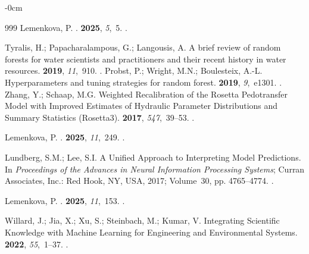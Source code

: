 \documentclass[land,review,accept,pdftex,oneauthor]{Definitions/mdpi}
\begin{document}
\begin{adjustwidth}{-\extralength}{0cm}
\begin{thebibliography}{999}
Lemenkova, P.
.
 {\bf 2025}, {\em 5},~5.
.

Tyralis, H.; Papacharalampous, G.; Langousis, A.
\newblock A brief review of random forests for water scientists and practitioners and their recent history in water resources.
 {\bf 2019}, {\em 11},~910.
.
Probst, P.; Wright, M.N.; Boulesteix, A.-L.
\newblock Hyperparameters and tuning strategies for random forest.
 {\bf 2019}, {\em 9},~e1301.
.
Zhang, Y.; Schaap, M.G.
\newblock Weighted Recalibration of the Rosetta Pedotransfer Model with
  Improved Estimates of Hydraulic Parameter Distributions and Summary
  Statistics ({Rosetta3}).
 {\bf 2017}, {\em 547},~39--53.
.

Lemenkova, P.
.
 {\bf 2025}, {\em 11},~249.
.

Lundberg, S.M.; Lee, S.I.
\newblock A Unified Approach to Interpreting Model Predictions.
\newblock In \emph{Proceedings of the Advances in Neural Information Processing
  Systems};  Curran Associates, Inc.: Red Hook, NY, USA,  2017; Volume~30, pp. 4765--4774.
.

Lemenkova, P.
.
 {\bf 2025}, {\em 11},~153.
.

Willard, J.; Jia, X.; Xu, S.; Steinbach, M.; Kumar, V.
\newblock Integrating Scientific Knowledge with Machine Learning for
  Engineering and Environmental Systems.
 {\bf 2022}, {\em 55},~1--37.
.


\end{thebibliography}
\end{adjustwidth}
\end{document}
